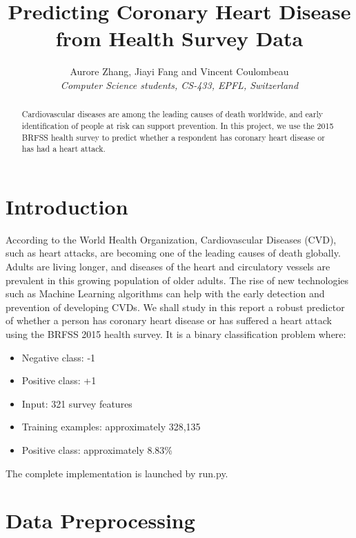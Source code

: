 \documentclass[10pt,conference,compsocconf]{IEEEtran}
\begin{document}
\title{Predicting Coronary Heart Disease from Health Survey Data
}

\author{
  Aurore Zhang, Jiayi Fang and Vincent Coulombeau \\
  \textit{Computer Science students, CS-433, EPFL, Switzerland}
}

\maketitle

\begin{abstract}
  Cardiovascular diseases are among the leading causes of death worldwide,
  and early identification of people at risk can support prevention. In this
  project, we use the 2015 BRFSS health survey to predict whether a respondent
  has coronary heart disease or has had a heart attack.
\end{abstract}

\section{Introduction}

According to the World Health Organization, Cardiovascular Diseases (CVD),
such as heart attacks, are becoming one of the leading causes of death
globally. Adults are living longer, and diseases of the heart and
circulatory vessels are prevalent in this growing population of older
adults. The rise of new technologies such as Machine Learning algorithms
can help with the early detection and prevention of developing CVDs.
We shall study in this report a robust predictor of whether a person has
coronary heart disease or has suffered a heart attack using the BRFSS
2015 health survey. It is a binary classification problem where:
\begin{itemize}
  \item Negative class: -1
  \item Positive class: +1
  \item Input: 321 survey features
  \item Training examples: approximately 328,135
  \item Positive class: approximately 8.83\%
\end{itemize}
The complete implementation is launched by run.py.

\section{Data Preprocessing}
\label{sec:structure-paper}
\end{document}
